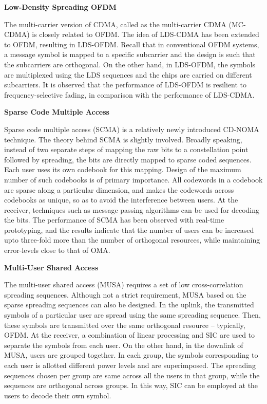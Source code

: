 \begin{multicols}{2}
\smallskip
\noindent
{\bf Low-Density Spreading OFDM}

The multi-carrier version of CDMA, called as the multi-carrier CDMA (MC-CDMA) is closely related to OFDM. The idea of LDS-CDMA has been extended to OFDM, resulting in LDS-OFDM. Recall that in conventional OFDM systems, a message symbol is mapped to a specific subcarrier and the design is such that the subcarriers are orthogonal. On the other hand, in LDS-OFDM, the symbols are multiplexed using the LDS sequences and the chips are carried on different subcarriers. It is observed that the performance of LDS-OFDM is resilient to frequency-selective fading, in comparison with the performance of LDS-CDMA.

\smallskip
\noindent
{\bf Sparse Code Multiple Access}

Sparse code multiple access (SCMA) is a relatively newly introduced CD-NOMA technique. The theory behind SCMA is slightly involved. Broadly speaking, instead of two separate steps of mapping the raw bits to a constellation point followed by spreading, the bits are directly mapped to sparse coded sequences. Each user uses its own codebook for this mapping. Design of the maximum number of such codebooks is of primary importance. All codewords in a codebook are sparse along a particular dimension, and makes the codewords across codebooks as unique, so as to avoid the interference between users. At the receiver, techniques such as message passing algorithms can be used for decoding the bits. The performance of SCMA has been observed with real-time prototyping, and the results indicate that the number of users can be increased upto three-fold more than the number of orthogonal resources, while maintaining error-levels close to that of OMA.

\smallskip
\noindent
{\bf Multi-User Shared Access}

The multi-user shared access (MUSA) requires a set of low cross-correlation spreading sequences. Although not a strict requirement, MUSA based on the sparse spreading sequences can also be designed. In the uplink, the transmitted symbols of a particular user are spread using the same spreading sequence. Then, these symbols are transmitted over the same orthogonal resource -- typically, OFDM. At the receiver, a combination of linear processing and SIC are used to separate the symbols from each user. On the other hand, in the downlink of MUSA, users are grouped together. In each group, the symbols corresponding to each user is allotted different power levels and are superimposed. The spreading sequences chosen per group are same across all the users in that group, while the sequences are orthogonal across groups. In this way, SIC can be employed at the users to decode their own symbol.


\end{multicols}
